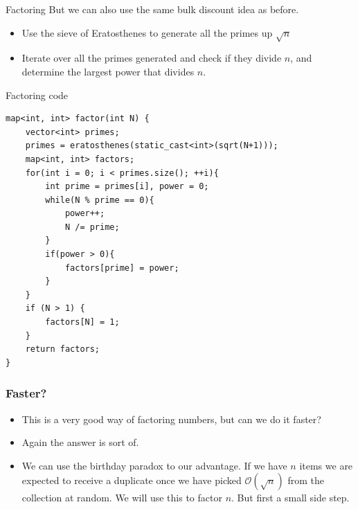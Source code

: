 \documentclass{beamer}
\begin{document}
\begin{frame}[plain]{Factoring}
  But we can also use the same bulk discount idea as before.
  \begin{itemize}
    \item Use the sieve of Eratosthenes to generate all the primes up
      $\sqrt{n}$
    \item Iterate over all the primes generated and check if they divide $n$,
      and determine the largest power that divides $n$.
  \end{itemize}
\end{frame}

\begin{frame}{Factoring code}
    \begin{verbatim}
map<int, int> factor(int N) {
    vector<int> primes;
    primes = eratosthenes(static_cast<int>(sqrt(N+1)));
    map<int, int> factors;
    for(int i = 0; i < primes.size(); ++i){
        int prime = primes[i], power = 0;
        while(N % prime == 0){
            power++;
            N /= prime;
        }
        if(power > 0){
            factors[prime] = power;
        }
    }
    if (N > 1) {
        factors[N] = 1;
    }
    return factors;
}
  \end{verbatim}
\end{frame}

\begin{frame}[plain]
\frametitle{Faster?}

\begin{itemize}

\item This is a very good way of factoring numbers, but can we do it faster?
    
\item Again the answer is sort of.

\item We can use the birthday paradox to our advantage. If we have $n$ items we are expected to receive a duplicate once we have picked $\mathcal{O}(\sqrt{n})$ from the collection at random. We will use this to factor $n$. But first a small side step.

\end{itemize}

\end{frame}
\end{document}

